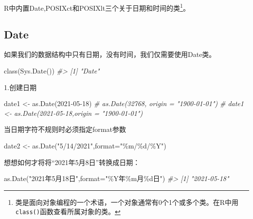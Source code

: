 \documentclass[
]{book}
\newenvironment{Shaded}{\begin{snugshade}}{\end{snugshade}}
\newcommand{\AttributeTok}[1]{\textcolor[rgb]{0.77,0.63,0.00}{#1}}
\newcommand{\CommentTok}[1]{\textcolor[rgb]{0.56,0.35,0.01}{\textit{#1}}}
\newcommand{\FunctionTok}[1]{\textcolor[rgb]{0.00,0.00,0.00}{#1}}
\newcommand{\NormalTok}[1]{#1}
\newcommand{\OtherTok}[1]{\textcolor[rgb]{0.56,0.35,0.01}{#1}}
\newcommand{\StringTok}[1]{\textcolor[rgb]{0.31,0.60,0.02}{#1}}
\begin{document}
R中内置Date,POSIXct和POSIXlt三个关于日期和时间的类\footnote{类是面向对象编程的一个术语，一个对象通常有0个1个或多个类。在R中用\texttt{class()}函数查看所属对象的类。}。

\hypertarget{the-date-class}{%
\subsection{Date}\label{the-date-class}}

如果我们的数据结构中只有日期，没有时间，我们仅需要使用Date类。

\begin{Shaded}
\begin{Highlighting}[]
\FunctionTok{class}\NormalTok{(}\FunctionTok{Sys.Date}\NormalTok{())}
\CommentTok{\#\textgreater{} [1] "Date"}
\end{Highlighting}
\end{Shaded}

1.创建日期

\begin{Shaded}
\begin{Highlighting}[]
\NormalTok{date1 }\OtherTok{\textless{}{-}} \FunctionTok{as.Date}\NormalTok{(}\StringTok{\textquotesingle{}2021{-}05{-}18\textquotesingle{}}\NormalTok{)}
\CommentTok{\# as.Date(32768, origin = "1900{-}01{-}01")}
\CommentTok{\# date1 \textless{}{-} as.Date(\textquotesingle{}2021{-}05{-}18\textquotesingle{},origin = "1900{-}01{-}01")}
\end{Highlighting}
\end{Shaded}

当日期字符不规则时必须指定format参数

\begin{Shaded}
\begin{Highlighting}[]
\NormalTok{date2 }\OtherTok{\textless{}{-}} \FunctionTok{as.Date}\NormalTok{(}\StringTok{"5/14/2021"}\NormalTok{,}\AttributeTok{format=}\StringTok{"\%m/\%d/\%Y"}\NormalTok{)}
\end{Highlighting}
\end{Shaded}

想想如何才将将``2021年5月8日''转换成日期：

\begin{Shaded}
\begin{Highlighting}[]
\FunctionTok{as.Date}\NormalTok{(}\StringTok{"2021年5月18日"}\NormalTok{,}\AttributeTok{format=}\StringTok{"\%Y年\%m月\%d日"}\NormalTok{)}
\CommentTok{\#\textgreater{} [1] "2021{-}05{-}18"}
\end{Highlighting}
\end{Shaded}
\end{document}
